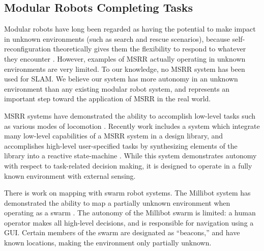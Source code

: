 \documentclass[conference]{IEEEtran}
\begin{document}
\subsection{Modular Robots Completing Tasks}
%
Modular robots have long been regarded as having the potential to make impact in unknown environments (such as search and rescue scenarios), because  self-reconfiguration theoretically gives them the flexibility to respond to whatever they encounter \cite{Yim2007a,Yim2000}.  However, examples of MSRR actually operating in unknown environments are very limited. To our knowledge, no MSRR system has been used for SLAM. We believe our system has more autonomy in an unknown environment than any existing modular robot system, and represents an important step toward the application of MSRR in the real world.

MSRR systems have demonstrated the ability to accomplish low-level tasks such as various modes of locomotion \cite{Yim1994}. Recently work includes a system which integrate many low-level capabilities of a MSRR system in a design library, and accomplishes high-level user-specified tasks by synthesizing elements of the library into a reactive state-machine \cite{Jing2016}. While this system demonstrates autonomy with respect to task-related decision making, it is designed to operate in a fully known environment with external sensing.

There is work on mapping with swarm robot systems. The Millibot system has demonstrated the ability to map a partially unknown environment when operating as a swarm \cite{Grabowski2000}. The autonomy of the Millibot swarm is limited: a human operator makes all high-level decisions, and is responsible for navigation using a GUI. Certain members of the swarm are designated as ``beacons,'' and have known locations, making the environment only partially unknown.
\end{document}
